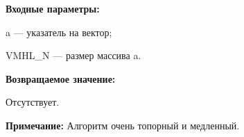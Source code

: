 \textbf{Входные параметры:}  
 
a --- указатель на вектор;
 
VMHL\_N --- размер массива a.

\textbf{Возвращаемое значение:}

Отсутствует.

\textbf{Примечание:}
 Алгоритм очень топорный и медленный.
